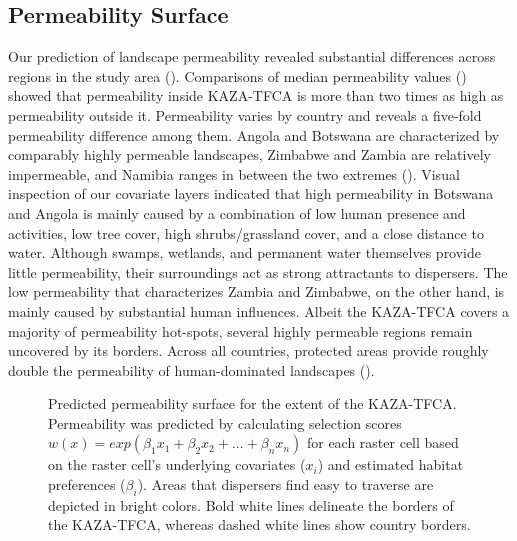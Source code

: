 \documentclass[abstract=on,10pt,a4paper,bibliography=totocnumbered]{article}
\begin{document}
\subsection{Permeability Surface}
Our prediction of landscape permeability revealed substantial differences across
regions in the study area (). Comparisons of median
permeability values () showed that permeability inside
KAZA-TFCA is more than two times as high as permeability outside it.
Permeability varies by country and reveals a five-fold permeability difference
among them. Angola and Botswana are characterized by comparably highly permeable
landscapes, Zimbabwe and Zambia are relatively impermeable, and Namibia ranges
in between the two extremes (). Visual inspection of our
covariate layers indicated that high permeability in Botswana and Angola is
mainly caused by a combination of low human presence and activities, low tree
cover, high shrubs/grassland cover, and a close distance to water. Although
swamps, wetlands, and permanent water themselves provide little permeability,
their surroundings act as strong attractants to dispersers. The low permeability
that characterizes Zambia and Zimbabwe, on the other hand, is mainly caused by
substantial human influences. Albeit the KAZA-TFCA covers a majority of
permeability hot-spots, several highly permeable regions remain uncovered by its
borders. Across all countries, protected areas provide roughly double the
permeability of human-dominated landscapes ().

\begin{figure}[hbtp]
  \begin{center}
    \caption{Predicted permeability surface for the extent of the KAZA-TFCA.
    Permeability was predicted by calculating selection scores \(w(x) =
    exp(\beta_1 x_1 + \beta_2 x_2 + ... + \beta_n x_n)\) for each raster cell
    based on the raster cell's underlying covariates (\(x_i\)) and estimated
    habitat preferences (\(\beta_i\)). Areas that dispersers find easy to
    traverse are depicted in bright colors. Bold white lines delineate the
    borders of the KAZA-TFCA, whereas dashed white lines show country borders.}
    \label{PermeabilityMap}
  \end{center}
\end{figure}
\end{document}
